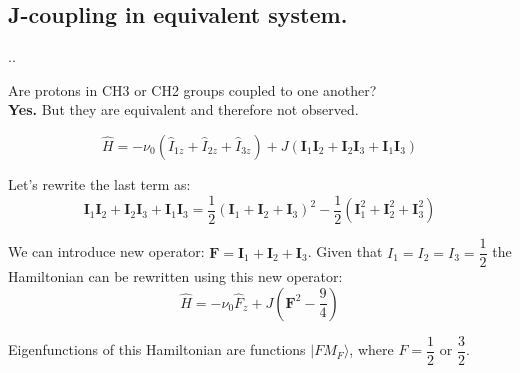 \documentclass[handout]{beamer}
\begin{document}
\subsection{J-coupling in equivalent system.}
\begin{frame}{\thesection.\thesubsection. \insertsubsection}

Are protons in CH3 or CH2 groups coupled to one another? \\
\textbf{Yes.} But they are equivalent and therefore not observed.


	
	\begin{equation}
	\hat{H} = - \nu_0 (\hat{I}_{1z} + \hat{I}_{2z}+ \hat{I}_{3z}) + J (\bm{I}_1 \bm{I}_2 + \bm{I}_2 \bm{I}_3  + \bm{I}_1 \bm{I}_3 )
	\end{equation}
	
	Let's rewrite the last term as:
	\begin{equation}
	\bm{I}_1 \bm{I}_2 + \bm{I}_2 \bm{I}_3  + \bm{I}_1 \bm{I}_3 = \dfrac{1}{2} (\bm{I}_1 + \bm{I}_2 + \bm{I}_3 )^2 - \dfrac{1}{2} ( \bm{I}_1^2 + \bm{I}_2^2 + \bm{I}_3^2)
	\end{equation}
	
	We can introduce new operator: $\bm{F} =\bm{I}_1 + \bm{I}_2 + \bm{I}_3$. Given that $I_1=I_2=I_3=\dfrac{1}{2}$ the Hamiltonian can be rewritten using this new operator:
	\begin{equation}
	\hat{H} = - \nu_0 \hat{F}_{z} + J (\bm{F}^2 - \dfrac{9}{4} )    
	\end{equation}
	
	Eigenfunctions of this Hamiltonian are functions $\vert F M_F \rangle$, where $F=\dfrac{1}{2}$ or $\dfrac{3}{2}$.


\end{frame}
\end{document}
